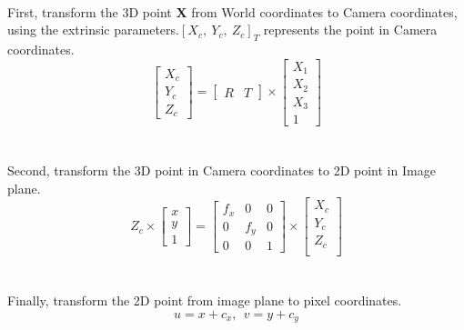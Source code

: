 \documentclass{article}
\begin{document}
\paragraph{}First, transform the 3D point \textbf{X} from World coordinates to Camera coordinates, using the extrinsic parameters.$[X_c,\ Y_c,\ Z_c]_T$ represents the point in Camera coordinates.
\\
\begin{equation}
\left[\begin{array}{c}
X_c\\
Y_c\\
Z_c
\end{array}
\right] = \left[\begin{array}{cc}
R & T
\end{array}
\right] \times \left[\begin{array}{c}
X_1\\
X_2\\
X_3\\
1
\end{array}
\right]
\end{equation}
\\
\paragraph{}Second, transform the 3D point in Camera coordinates to 2D point in Image plane.
\\
\begin{equation}
Z_c \times \left[\begin{array}{c}
x\\
y\\
1
\end{array}
\right] =  \left[\begin{array}{ccc}
f_x & 0 & 0\\
0 & f_y & 0\\
0 & 0 & 1
\end{array}
\right] \times \left[\begin{array}{c}
X_c\\
Y_c\\
Z_c\\
\end{array}
\right]
\end{equation}
\\
\paragraph{}Finally, transform the 2D point from image plane to pixel coordinates.
\\
\begin{equation}
u = x + c_x,\ \ v = y + c_y
\end{equation}
\\
\end{document}
